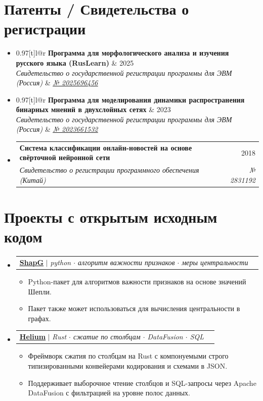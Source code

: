 \documentclass[letterpaper,10pt]{article}
\makeatletter
\newcommand{\link}[2]{\href{#1}{\color{blue}\underline{#2}}}
\newcommand{\resumeItem}[1]{
  \item\small{
    {#1 \vspace{-2pt}}
  }
}
\newcommand{\resumeSubheading}[4]{
  \vspace{-2pt}\item
  \begin{tabular*}{0.97\textwidth}[t]{l@{\extracolsep{\fill}}r}
    \textbf{#1} & #2 \\
    \textit{\small#3} & \textit{\small #4} \\
  \end{tabular*}\vspace{-7pt}
}
\newcommand{\resumeProjectHeading}[2]{
  \item
  \begin{tabular*}{0.97\textwidth}{l@{\extracolsep{\fill}}r}
    \small#1 & #2 \\
  \end{tabular*}\vspace{-7pt}
}
\newenvironment{resumeSubHeadingList}{\begin{itemize}[leftmargin=0.15in, label={}]}{\end{itemize}}
\newenvironment{resumeItemList}{\begin{itemize}}{\end{itemize}}
\makeatother
\begin{document}
\section{Патенты / Свидетельства о регистрации}
\begin{resumeSubHeadingList}
  \resumeSubheading
    {Программа для морфологического анализа и изучения русского языка (RusLearn)}{2025}
    {Свидетельство о государственной регистрации программы для ЭВМ (Россия)}{{\link{https://new.fips.ru/registers-doc-view/fips_servlet?DB=EVM&DocNumber=2025696456&TypeFile=html}{№ 2025696456}}}
  \resumeSubheading
    {Программа для моделирования динамики распространения бинарных мнений в двухслойных сетях}{2023}
    {Свидетельство о государственной регистрации программы для ЭВМ (Россия)}{{\link{https://new.fips.ru/registers-doc-view/fips_servlet?DB=EVM&DocNumber=2023661532&TypeFile=html}{№ 2023661532}}}
  \resumeSubheading
    {Система классификации онлайн-новостей на основе свёрточной нейронной сети}{2018}
    {Свидетельство о регистрации программного обеспечения (Китай)}{№ 2831192}
\end{resumeSubHeadingList}

\section{Проекты с открытым исходным кодом}
\begin{resumeSubHeadingList}

  \resumeProjectHeading{
    \link{https://github.com/vectorsss/shapG}{\textbf{ShapG}} $|$
    \emph{python $\cdot$ алгоритм важности признаков $\cdot$ меры
          центральности}}{}
  \begin{resumeItemList}
    \resumeItem{Python-пакет для алгоритмов важности признаков на основе
                значений Шепли.}
    \resumeItem{Пакет также может использоваться для вычисления центральности
      в графах.}
  \end{resumeItemList}
  \resumeProjectHeading{
    \link{https://github.com/vectorsss/helium-columnar}{\textbf{Helium}} $|$
    \emph{Rust $\cdot$ сжатие по столбцам $\cdot$ DataFusion $\cdot$ SQL}}{}
  \begin{resumeItemList}
    \resumeItem{Фреймворк сжатия по столбцам на Rust с компонуемыми строго типизированными конвейерами кодирования и схемами в JSON.}
    \resumeItem{Поддерживает выборочное чтение столбцов и SQL-запросы через Apache DataFusion с фильтрацией на уровне полос данных.}
  \end{resumeItemList}
\end{resumeSubHeadingList}
\end{document}
